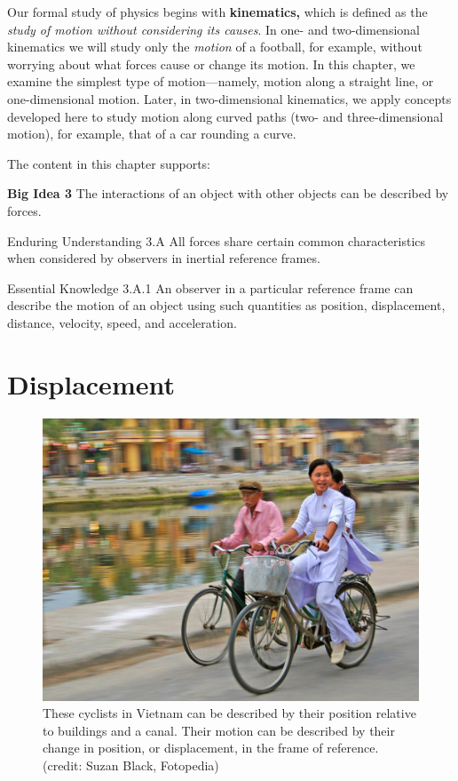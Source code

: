 \documentclass[
]{book}
\begin{document}
Our formal study of physics begins with \textbf{kinematics,} which is defined
as the \emph{study of motion without considering its causes}. In one- and
two-dimensional kinematics we will study only the \emph{motion} of a
football, for example, without worrying about what forces cause or
change its motion. In this chapter, we examine the simplest type of
motion---namely, motion along a straight line, or one-dimensional
motion. Later, in two-dimensional kinematics, we apply concepts
developed here to study motion along curved paths (two- and
three-dimensional motion), for example, that of a car rounding a curve.

The content in this chapter supports:

\textbf{Big Idea 3} The interactions of an object with other objects can be
described by forces.

Enduring Understanding 3.A All forces share certain common
characteristics when considered by observers in inertial reference
frames.

Essential Knowledge 3.A.1 An observer in a particular reference frame
can describe the motion of an object using such quantities as position,
displacement, distance, velocity, speed, and acceleration.

\hypertarget{concept-trailer-1d-kinematics}{}

\hypertarget{displacement}{%
\section{Displacement}\label{displacement}}

\begin{figure}
\hypertarget{import-auto-id2723149}{%
\centering
\includegraphics{images/Figure_02_01_00.jpg}
\caption{These cyclists in Vietnam can be described by their position relative
to buildings and a canal. Their motion can be described by their change
in position, or displacement, in the frame of reference. (credit: Suzan
Black, Fotopedia)}\label{import-auto-id2723149}
}
\end{figure}
\end{document}
